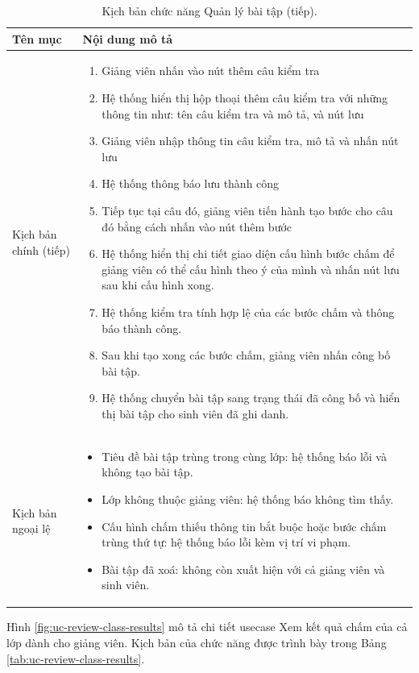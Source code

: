 \documentclass[../BTL.tex]{subfiles}
\begin{document}
\begin{table}[H]
\centering
\begin{tabularx}{\textwidth}{|p{3.2cm}|X|}
\hline
Tên mục & Nội dung mô tả \\ \hline
Kịch bản chính (tiếp) &
\begin{enumerate}[leftmargin=*, nosep, start=9]
    \item Giảng viên nhấn vào nút thêm câu kiểm tra
    \item Hệ thống hiển thị hộp thoại thêm câu kiểm tra với những thông tin như: tên câu kiểm tra và mô tả, và nút lưu
    \item Giảng viên nhập thông tin câu kiểm tra, mô tả và nhấn nút lưu
    \item Hệ thống thông báo lưu thành công
    \item Tiếp tục tại câu đó, giảng viên tiến hành tạo bước cho câu đó bằng cách nhấn vào nút thêm bước
    \item Hệ thống hiển thị chi tiết giao diện cấu hình bước chấm để giảng viên có thể cấu hình theo ý của mình và nhấn nút lưu sau khi cấu hình xong.
    \item Hệ thống kiểm tra tính hợp lệ của các bước chấm và thông báo thành công.
    \item Sau khi tạo xong các bước chấm, giảng viên nhấn công bố bài tập.
    \item Hệ thống chuyển bài tập sang trạng thái đã công bố và hiển thị bài tập cho sinh viên đã ghi danh.
\end{enumerate} \\ \hline
Kịch bản ngoại lệ &
\begin{itemize}[leftmargin=*, nosep]
    \item Tiêu đề bài tập trùng trong cùng lớp: hệ thống báo lỗi và không tạo bài tập.
    \item Lớp không thuộc giảng viên: hệ thống báo không tìm thấy.
    \item Cấu hình chấm thiếu thông tin bắt buộc hoặc bước chấm trùng thứ tự: hệ thống báo lỗi kèm vị trí vi phạm.
    \item Bài tập đã xoá: không còn xuất hiện với cả giảng viên và sinh viên.
\end{itemize} \\ \hline
\end{tabularx}
\caption{Kịch bản chức năng Quản lý bài tập (tiếp).}
\label{tab:uc-assignment-management-2}
\end{table}


Hình \ref{fig:uc-review-class-results} mô tả chi tiết usecase Xem kết quả chấm của cả lớp dành cho giảng viên. Kịch bản của chức năng được trình bày trong Bảng \ref{tab:uc-review-class-results}.
\end{document}
